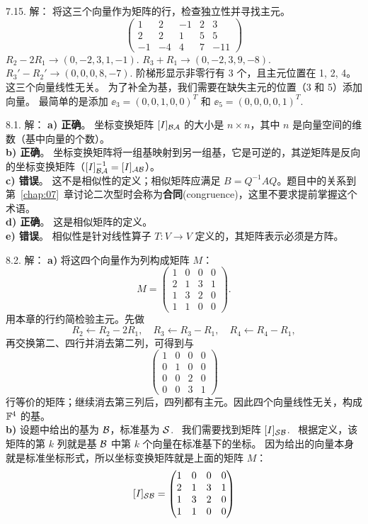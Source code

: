 \begin{exer}
7.15. 解：
将这三个向量作为矩阵的行，检查独立性并寻找主元。
$$ \begin{pmatrix} 1 & 2 & -1 & 2 & 3 \\ 2 & 2 & 1 & 5 & 5 \\ -1 & -4 & 4 & 7 & -11 \end{pmatrix} $$
$R_2 - 2R_1 \to (0, -2, 3, 1, -1)$.
$R_3 + R_1 \to (0, -2, 3, 9, -8)$.
$R_3' - R_2' \to (0, 0, 0, 8, -7)$.
阶梯形显示非零行有 3 个，且主元位置在 1, 2, 4。
这三个向量线性无关。
为了补全为基，我们需要在缺失主元的位置（3 和 5）添加向量。
最简单的是添加 $\ee_3 = (0, 0, 1, 0, 0)^T$ 和 $\ee_5 = (0, 0, 0, 0, 1)^T$.~

\vspace{5ex}


8.1. 解：
\textbf{a) 正确}。
坐标变换矩阵 $[I]_{\mathcal{B} \mathcal{A} }$ 的大小是 $n \times n$，其中 $n$ 是向量空间的维数（基中向量的个数）。
\\
\textbf{b) 正确}。
坐标变换矩阵将一组基映射到另一组基，它是可逆的，其逆矩阵是反向的坐标变换矩阵（$[I]_{\mathcal{B} \mathcal{A} }^{-1} = [I]_{\mathcal{A} \mathcal{B} }$）。
\\
\textbf{c) 错误}。
这不是相似性的定义；相似矩阵应满足 $B=Q^{-1}AQ$。题目中的关系到第~\ref{chap:07}~章讨论二次型时会称为\textbf{合同}(congruence)，这里不要求提前掌握这个术语。
\\
\textbf{d) 正确}。
这是相似矩阵的定义。
\\
\textbf{e) 错误}。
相似性是针对线性算子 $T: V \to V$ 定义的，其矩阵表示必须是方阵。

8.2. 解：
\textbf{a)} 将这四个向量作为列构成矩阵 $M$：
$$ M = \begin{pmatrix} 1 & 0 & 0 & 0 \\ 2 & 1 & 3 & 1 \\ 1 & 3 & 2 & 0 \\ 1 & 1 & 0 & 0 \end{pmatrix}. $$
用本章的行约简检验主元。先做
$$R_2\leftarrow R_2-2R_1,\quad R_3\leftarrow R_3-R_1,\quad R_4\leftarrow R_4-R_1,$$
再交换第二、四行并消去第二列，可得到与
$$\begin{pmatrix}1&0&0&0\\0&1&0&0\\0&0&2&0\\0&0&3&1\end{pmatrix}$$
行等价的矩阵；继续消去第三列后，四列都有主元。因此四个向量线性无关，构成 $\mathbb{F}^4$ 的基。
\\
\textbf{b)} 设题中给出的基为 $\mathcal{B} $，标准基为 $\mathcal{S} $.~
我们需要找到矩阵 $[I]_{\mathcal{S} \mathcal{B} }$.~
根据定义，该矩阵的第 $k$ 列就是基 $\mathcal{B} $ 中第 $k$ 个向量在标准基下的坐标。
因为给出的向量本身就是标准坐标形式，所以坐标变换矩阵就是上面的矩阵 $M$：
$$ [I]_{\mathcal{S} \mathcal{B} } = \begin{pmatrix} 1 & 0 & 0 & 0 \\ 2 & 1 & 3 & 1 \\ 1 & 3 & 2 & 0 \\ 1 & 1 & 0 & 0 \end{pmatrix} $$


\end{exer}
